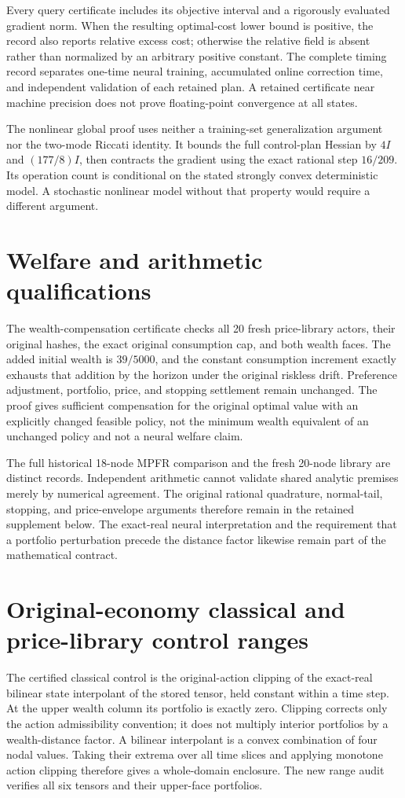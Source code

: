 Every query certificate includes its objective interval and a rigorously evaluated gradient norm. When the resulting optimal-cost lower bound is positive, the record also reports relative excess cost; otherwise the relative field is absent rather than normalized by an arbitrary positive constant. The complete timing record separates one-time neural training, accumulated online correction time, and independent validation of each retained plan. A retained certificate near machine precision does not prove floating-point convergence at all states.

The nonlinear global proof uses neither a training-set generalization argument nor the two-mode Riccati identity. It bounds the full control-plan Hessian by $4I$ and $(177/8)I$, then contracts the gradient using the exact rational step $16/209$. Its operation count is conditional on the stated strongly convex deterministic model. A stochastic nonlinear model without that property would require a different argument.

\section{Welfare and arithmetic qualifications}\label{supp:r18welfare}
The wealth-compensation certificate checks all 20 fresh price-library actors, their original hashes, the exact original consumption cap, and both wealth faces. The added initial wealth is $39/5000$, and the constant consumption increment exactly exhausts that addition by the horizon under the original riskless drift. Preference adjustment, portfolio, price, and stopping settlement remain unchanged. The proof gives sufficient compensation for the original optimal value with an explicitly changed feasible policy, not the minimum wealth equivalent of an unchanged policy and not a neural welfare claim.

The full historical 18-node MPFR comparison and the fresh 20-node library are distinct records. Independent arithmetic cannot validate shared analytic premises merely by numerical agreement. The original rational quadrature, normal-tail, stopping, and price-envelope arguments therefore remain in the retained supplement below. The exact-real neural interpretation and the requirement that a portfolio perturbation precede the distance factor likewise remain part of the mathematical contract.

\clearpage
\section{Original-economy classical and price-library control ranges}\label{supp:classicalcontrols}
The certified classical control is the original-action clipping of the exact-real bilinear state interpolant of the stored tensor, held constant within a time step. At the upper wealth column its portfolio is exactly zero. Clipping corrects only the action admissibility convention; it does not multiply interior portfolios by a wealth-distance factor. A bilinear interpolant is a convex combination of four nodal values. Taking their extrema over all time slices and applying monotone action clipping therefore gives a whole-domain enclosure. The new range audit verifies all six tensors and their upper-face portfolios.

